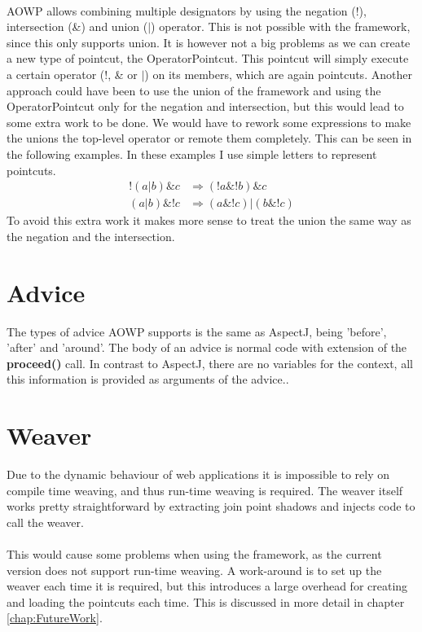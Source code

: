 \documentclass[a4paper]{report}
\begin{document}
\\
AOWP allows combining multiple designators by using the negation (!), intersection (\&) and union ($|$) operator. This is not possible with the framework, since this only supports union. It is however not a big problems as we can create a new type of pointcut, the OperatorPointcut. This pointcut will simply execute a certain operator (!, \& or $|$) on its members, which are again pointcuts. Another approach could have been to use the union of the framework and using the OperatorPointcut only for the negation and intersection, but this would lead to some extra work to be done. We would have to rework some expressions to make the unions the top-level operator or remote them completely. This can be seen in the following examples. In these examples I use simple letters to represent pointcuts.
\begin{align*}
!\left(a | b\right) \& c & \Rightarrow \left(!a \& !b\right) \& c\\
\left(a | b \right) \& !c & \Rightarrow \left(a \& !c\right) | \left(b \& !c \right)
\end{align*}
To avoid this extra work it makes more sense to treat the union the same way as the negation and the intersection.

\section{Advice}
The types of advice AOWP supports is the same as AspectJ, being 'before', 'after' and 'around'. The body of an advice is normal code with extension of the \textbf{proceed()} call. In contrast to AspectJ, there are no variables for the context, all this information is provided as arguments of the advice..

\section{Weaver}
Due to the dynamic behaviour of web applications it is impossible to rely on compile time weaving, and thus run-time weaving is required. The weaver itself works pretty straightforward by extracting join point shadows and injects code to call the weaver.\\
\\
This would cause some problems when using the framework, as the current version does not support run-time weaving. A work-around is to set up the weaver each time it is required, but this introduces a large overhead for creating and loading the pointcuts each time. This is discussed in more detail in chapter \ref{chap:FutureWork}.
\end{document}

